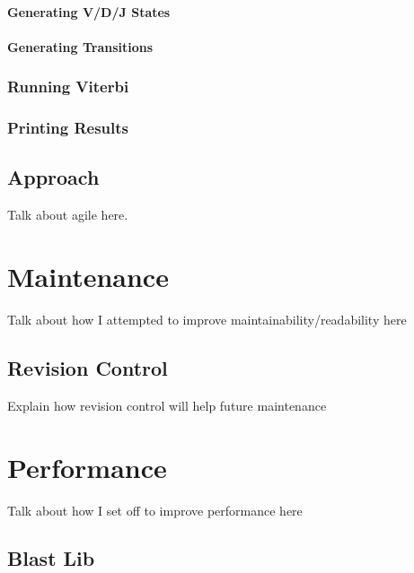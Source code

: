 \subsubsection{Generating V/D/J States}
\subsubsection{Generating Transitions}
\subsection{Running Viterbi}
\subsection{Printing Results}


\section{Approach}
Talk about agile here.

\chapter{Maintenance}
Talk about how I attempted to improve maintainability/readability here

\section{Revision Control}
Explain how revision control will help future maintenance 

\chapter{Performance}
Talk about how I set off to improve performance here

\section{Blast Lib}
